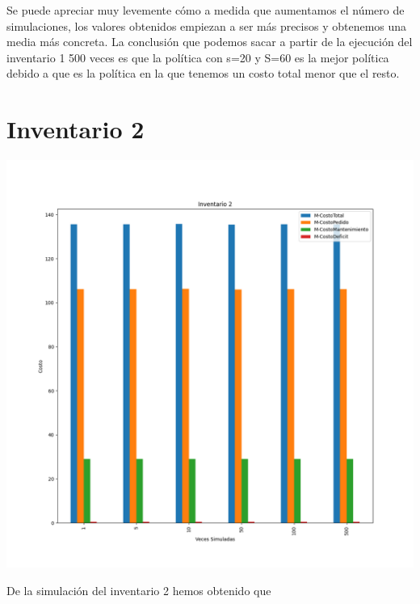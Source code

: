 \documentclass[11pt,a4paper]{report}
\begin{document}
Se puede apreciar muy levemente cómo a medida que aumentamos el número de simulaciones, los valores obtenidos empiezan a ser más precisos y obtenemos una media más concreta. 
La conclusión que podemos sacar a partir de la ejecución del inventario 1 500 veces es que la política con s=20 y S=60 es la mejor política debido a que es la política en la que tenemos un costo total menor que el resto.

\section{Inventario 2}

\begin{center}
	\includegraphics[width=0.45\textheight]{img/Cap-2/inventario-2/inventario2.png}
\end{center}

De la simulación del inventario 2 hemos obtenido que 
\end{document}
